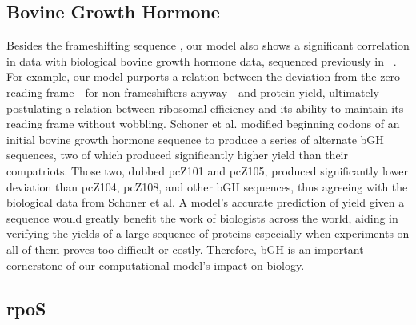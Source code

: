 \documentclass[12pt]{article}
\begin{document}
\subsection{Bovine Growth Hormone}
Besides the frameshifting sequence \prfB, our model also shows a significant correlation in data with biological
bovine growth hormone data, sequenced previously in \ecoli~\cite{schoner:bgh}. For example, our model purports a relation
between the deviation from the zero reading frame---for non-frameshifters anyway---and protein yield, ultimately postulating
a relation between ribosomal efficiency and its ability to maintain its reading frame without wobbling. Schoner et al.
modified beginning codons of an initial bovine growth hormone sequence to produce a series of alternate bGH sequences,
two of which produced significantly higher yield than their compatriots. Those two, dubbed pcZ101 and pcZ105, produced significantly
lower deviation than pcZ104, pcZ108, and other bGH sequences, thus agreeing with the biological data from Schoner et al.
A model's accurate prediction of yield given a sequence would greatly benefit the work of biologists across the world,
aiding in verifying the yields of a large sequence of proteins especially when experiments on all of them proves too difficult
or costly. Therefore, bGH is an important cornerstone of our computational model's impact on biology.

\subsection{rpoS}


\end{document}
